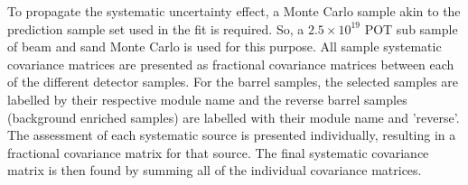 \newline
\newline
To propagate the systematic uncertainty effect, a Monte Carlo sample akin to the prediction sample set used in the fit is required.  So, a $2.5\times10^{19}$ POT sub sample of beam and sand Monte Carlo is used for this purpose.  All sample systematic covariance matrices are presented as fractional covariance matrices between each of the different detector samples.  For the barrel samples, the selected samples are labelled by their respective module name and the reverse barrel samples (background enriched samples) are labelled with their module name and 'reverse'.  The assessment of each systematic source is presented individually, resulting in a fractional covariance matrix for that source.  The final systematic covariance matrix is then found by summing all of the individual covariance matrices.
